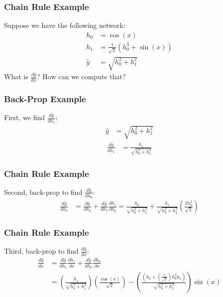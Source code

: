 \documentclass{beamer}
\begin{document}
\begin{frame}
  \frametitle{Chain Rule Example}

  Suppose we have the following network:
  \begin{align*}
    h_0 &= \cos(x)\\
    h_1 &= \frac{1}{\sqrt{2}}\left(h_0^3+\sin(x)\right)\\
    \hat{y} &= \sqrt{h_0^2+h_1^2}
  \end{align*}
  What  is $\frac{d\hat{y}}{dx}$?  How can we compute that?
\end{frame}

\begin{frame}
  \frametitle{Back-Prop Example}

  First, we find $\frac{d\hat{y}}{dh_1}$:
  \begin{align*}
    \hat{y} &= \sqrt{h_0^2+h_1^2}
  \end{align*}
  \begin{align*}
    \frac{d\hat{y}}{dh_1} &= \frac{h_1}{\sqrt{h_0^2+h_1^2}}
  \end{align*}
\end{frame}

\begin{frame}
  \frametitle{Chain Rule Example}

  Second, back-prop to find $\frac{d\hat{y}}{dh_0}$:
  \begin{align*}
    \frac{d\hat{y}}{dh_0} &=\frac{\partial\hat{y}}{\partial h_0}
    + \frac{d\hat{y}}{d h_1}\frac{\partial h_1}{\partial h_0}
    = \frac{h_0}{\sqrt{h_0^2+h_1^2}} +\frac{h_1}{\sqrt{h_0^2+h_1^2}}
    \left(\frac{3h_0^2}{\sqrt{2}}\right)
  \end{align*}
\end{frame}

\begin{frame}
  \frametitle{Chain Rule Example}

  Third, back-prop to find $\frac{d\hat{y}}{dx}$:
  \begin{align*}
    \frac{d\hat{y}}{dx} &=\frac{d\hat{y}}{dh_1}\frac{\partial h_1}{\partial x}
    + \frac{d\hat{y}}{d h_0}\frac{\partial h_0}{\partial x}\\
    &= \left(\frac{h_1}{\sqrt{h_0^2+h_1^2}}\right)\left(\frac{\cos(x)}{\sqrt{2}}\right)
    - \left(\frac{\left(h_0+\left(\frac{3}{\sqrt{2}}\right)h_0^2h_1\right)}{\sqrt{h_0^2+h_1^2}}\right)
    \sin(x)
  \end{align*}
\end{frame}
\end{document}
